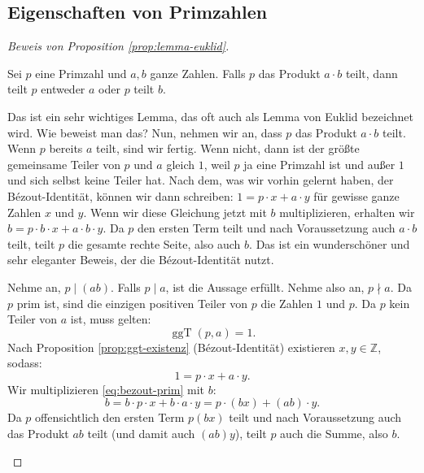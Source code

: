 \subsection{Eigenschaften von Primzahlen}

\begin{math-stroke}
\end{math-stroke}

\begin{proof}[Beweis von Proposition \ref{prop:lemma-euklid}]
\begin{spoken-clean}[00:44:44 - 00:47:15]
Sei $p$ eine Primzahl und $a, b$ ganze Zahlen. Falls $p$ das Produkt $a \cdot b$ teilt, dann teilt $p$ entweder $a$ oder $p$ teilt $b$.

Das ist ein sehr wichtiges Lemma, das oft auch als Lemma von Euklid bezeichnet wird. Wie beweist man das? Nun, nehmen wir an, dass $p$ das Produkt $a \cdot b$ teilt. Wenn $p$ bereits $a$ teilt, sind wir fertig. Wenn nicht, dann ist der größte gemeinsame Teiler von $p$ und $a$ gleich $1$, weil $p$ ja eine Primzahl ist und außer $1$ und sich selbst keine Teiler hat. Nach dem, was wir vorhin gelernt haben, der Bézout-Identität, können wir dann schreiben: $1 = p \cdot x + a \cdot y$ für gewisse ganze Zahlen $x$ und $y$. Wenn wir diese Gleichung jetzt mit $b$ multiplizieren, erhalten wir $b = p \cdot b \cdot x + a \cdot b \cdot y$. Da $p$ den ersten Term teilt und nach Voraussetzung auch $a \cdot b$ teilt, teilt $p$ die gesamte rechte Seite, also auch $b$. Das ist ein wunderschöner und sehr eleganter Beweis, der die Bézout-Identität nutzt.
\end{spoken-clean}

\begin{math-stroke}
\begin{short-proof}
Nehme an, $p \mid (ab)$. Falls $p \mid a$, ist die Aussage erfüllt. 
Nehme also an, $p \nmid a$. Da $p$ prim ist, sind die einzigen positiven Teiler von $p$ die Zahlen $1$ und $p$. Da $p$ kein Teiler von $a$ ist, muss gelten:
\[
\operatorname{ggT}(p, a) = 1.
\]
Nach Proposition \ref{prop:ggt-existenz} (Bézout-Identität) existieren $x, y \in \mathbb{Z}$, sodass:
\begin{equation}\label{eq:bezout-prim}
1 = p \cdot x + a \cdot y.
\end{equation}
Wir multiplizieren \eqref{eq:bezout-prim} mit $b$:
\[
b = b \cdot p \cdot x + b \cdot a \cdot y = p \cdot (bx) + (ab) \cdot y.
\]
Da $p$ offensichtlich den ersten Term $p(bx)$ teilt und nach Voraussetzung auch das Produkt $ab$ teilt (und damit auch $(ab)y$), teilt $p$ auch die Summe, also $b$.
\end{short-proof}
\end{math-stroke}
\end{proof}

